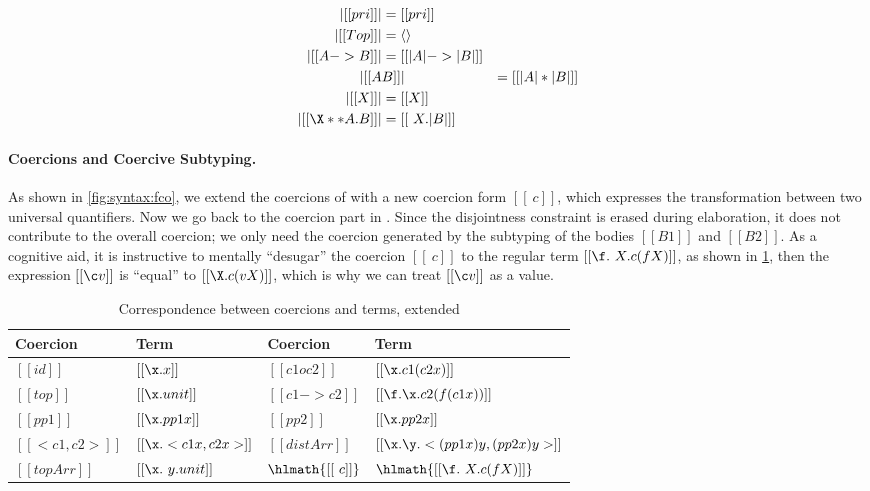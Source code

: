 \begin{definition} \label{def:type:translate:fi}
  \begin{align*}
    | [[pri]] | &= [[pri]] \\
    | [[Top]] | &= \langle \rangle \\
    | [[A -> B]]  | &= [[ | A | -> | B |  ]] \\
    | [[ A & B  ]] | &= [[ | A | * | B |  ]] \\
    | [[ X  ]] | &= [[ X ]] \\
    | [[ \X ** A . B ]] | &= [[ \ X . | B | ]]
  \end{align*}
\end{definition}


\paragraph{Coercions and Coercive Subtyping.}

As shown in \cref{fig:syntax:fco}, we extend the coercions of \tname with a new
coercion form $[[ \ c ]]$, which expresses the transformation between two
universal quantifiers. Now we go back to the coercion part in .
Since the disjointness constraint is erased during elaboration, it does not
contribute to the overall coercion; we only need the coercion generated by the
subtyping of the bodies $[[B1]]$ and $[[B2]]$. As a cognitive aid, it is
instructive to mentally ``desugar'' the coercion $[[\ c]]$ to the regular term
$[[ \f . \ X . c (f X)]]$, as shown in \cref{tab:coercion2}, then the expression
$ [[\c v]] $ is ``equal'' to $[[ \X . c (v X) ]]$, which is why we can treat $[[ \c v]]$ as a value.


\begin{table}[t]
  \centering
\begin{tabular}{|l|l||l|l|}
\hline
Coercion & Term & Coercion & Term \\ \hline
$[[id]]$         & $[[ \x . x]]$  & $[[ c1 o c2  ]]$    &  $[[  \x . c1 (c2 x) ]]$     \\ \hline
$[[top]]$         & $[[ \x . unit ]]$  & $[[ c1 -> c2  ]]$    &  $[[  \f . \x . c2 (f (c1 x))  ]]$     \\ \hline
$[[  pp1   ]]$         & $[[ \x . pp1 x    ]]$  & $[[ pp2  ]]$    &  $[[  \x . pp2 x  ]]$     \\ \hline
$[[  < c1 , c2 >   ]]$         & $[[ \x . < c1 x, c2 x >    ]]$  & $[[ distArr  ]]$    &  $[[  \x . \y . < (pp1 x) y , (pp2 x) y > ]]$     \\ \hline
$[[  topArr   ]]$         & $[[ \x . \ y . unit    ]]$  & $\hlmath{[[ \ c  ]]}$ &  $\hlmath{[[   \f . \ X . c (f X)    ]]}$   \\ \hline
\end{tabular}
  \caption{Correspondence between coercions and terms, extended}
  \label{tab:coercion2}
\end{table}



